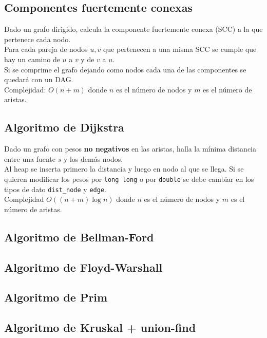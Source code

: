 \documentclass[10pt,letterpaper,twocolumn]{article}
\newcommand{\source}[1]{
	
	\dotfill
}
\begin{document}
	\subsection{Componentes fuertemente conexas}
		Dado un grafo dirigido, calcula la componente fuertemente conexa (SCC) a la que pertenece cada nodo.\\
		Para cada pareja de nodos $u, v$ que pertenecen a una misma SCC se cumple que hay un camino de $u$ a $v$ y de $v$ a $u$.\\
		Si se comprime el grafo dejando como nodos cada una de las componentes se quedará con un DAG.\\
		Complejidad: $O(n+m)$ donde $n$ es el número de nodos y $m$ es el número de aristas.\\
		\source{./src/componentes_conexas.cpp}
	
	\subsection{Algoritmo de Dijkstra}
		Dado un grafo con pesos \textbf{no negativos} en las aristas, halla la mínima distancia entre una fuente $s$ y los demás nodos.\\
		Al heap se inserta primero la distancia y luego en nodo al que se llega. Si se quieren modificar los pesos por \verb|long long| o por \verb|double| se debe cambiar en los tipos de dato \verb|dist_node| y \verb|edge|.\\
		Complejidad $O((n+m) \operatorname{log} n)$ donde $n$ es el número de nodos y $m$ es el número de aristas.\\
		\source{./src/dijkstra.cpp}
		
	\subsection{Algoritmo de Bellman-Ford}
	
	\subsection{Algoritmo de Floyd-Warshall}
	
	\subsection{Algoritmo de Prim}
	
	\subsection{Algoritmo de Kruskal + union-find}
	
\end{document}
